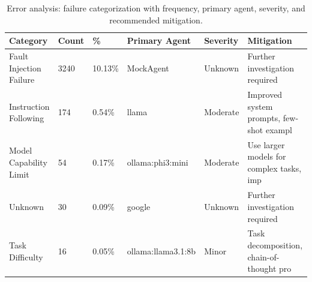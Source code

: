 \begin{table}[t]
\centering
\caption{Error analysis: failure categorization with frequency, primary agent, severity, and recommended mitigation.}
\label{tab:errors}
\begin{tabular}{llllll}
\toprule
Category & Count & \% & Primary Agent & Severity & Mitigation \\
\midrule
Fault Injection Failure & 3240 & 10.13\% & MockAgent & Unknown & Further investigation required \\
Instruction Following & 174 & 0.54\% & llama & Moderate & Improved system prompts, few-shot exampl \\
Model Capability Limit & 54 & 0.17\% & ollama:phi3:mini & Moderate & Use larger models for complex tasks, imp \\
Unknown & 30 & 0.09\% & google & Unknown & Further investigation required \\
Task Difficulty & 16 & 0.05\% & ollama:llama3.1:8b & Minor & Task decomposition, chain-of-thought pro \\
\bottomrule
\end{tabular}
\end{table}
